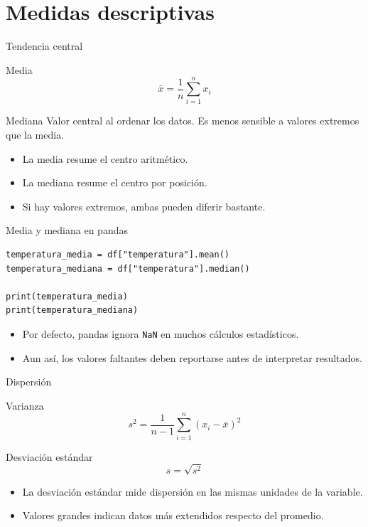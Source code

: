 \documentclass[10pt]{beamer}
\begin{document}
\section{Medidas descriptivas}

\begin{frame}{Tendencia central}
  \begin{block}{Media}
    \[
      \bar{x} = \frac{1}{n}\sum_{i=1}^{n} x_i
    \]
  \end{block}
  \begin{block}{Mediana}
    Valor central al ordenar los datos. Es menos sensible a valores extremos que la media.
  \end{block}
  \begin{itemize}
    \item La media resume el centro aritmético.
    \item La mediana resume el centro por posición.
    \item Si hay valores extremos, ambas pueden diferir bastante.
  \end{itemize}
\end{frame}

\begin{frame}[fragile]{Media y mediana en pandas}
\begin{verbatim}
temperatura_media = df["temperatura"].mean()
temperatura_mediana = df["temperatura"].median()

print(temperatura_media)
print(temperatura_mediana)
\end{verbatim}

  \begin{itemize}
    \item Por defecto, pandas ignora \texttt{NaN} en muchos cálculos estadísticos.
    \item Aun así, los valores faltantes deben reportarse antes de interpretar resultados.
  \end{itemize}
\end{frame}

\begin{frame}{Dispersión}
  \begin{block}{Varianza}
    \[
      s^2 = \frac{1}{n-1}\sum_{i=1}^{n}(x_i-\bar{x})^2
    \]
  \end{block}
  \begin{block}{Desviación estándar}
    \[
      s = \sqrt{s^2}
    \]
  \end{block}
  \begin{itemize}
    \item La desviación estándar mide dispersión en las mismas unidades de la variable.
    \item Valores grandes indican datos más extendidos respecto del promedio.
  \end{itemize}
\end{frame}
\end{document}
